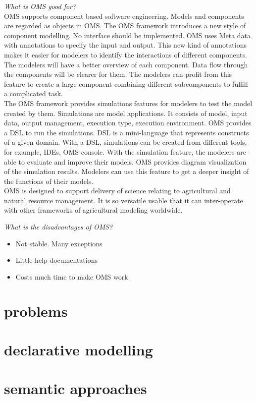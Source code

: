 \emph{What is OMS good for?}\\
OMS supports component based software engineering. Models and components are regarded as objects in OMS. The OMS framework introduces a new style of component modelling. No interface should be implemented. OMS uses Meta data with annotations to specify the input and output. This new kind of annotations makes it easier for modelers to identify the interactions of different components. The modelers will have a better overview of each component. Data flow through the components will be clearer for them. The modelers can profit from this feature to create a large component combining different subcomponents to fulfill a complicated task.\\
The OMS framework provides simulations features for modelers to test the model created by them. Simulations are model applications. It consists of model, input data, output management, execution type, execution environment. OMS provides a DSL to run the simulations. DSL is a mini-language that represents constructs of a given domain. With a DSL, simulations can be created from different tools, for example, IDEs, OMS console. With the simulation feature, the modelers are able to evaluate and improve their models.
OMS provides diagram visualization of the simulation results. Modelers can use this feature to get a deeper insight of the functions of their models.\\
OMS is designed to support delivery of science relating to agricultural and natural resource management. It is so versatile usable that it can inter-operate with other frameworks of agricultural modeling worldwide.

\emph{What is the disadvantages of OMS?}\\
\begin{itemize}
	\item Not stable. Many exceptions
	\item Little help documentations
	\item Costs much time to make OMS work
\end{itemize}

\section{problems}
\section{declarative modelling}
\section{semantic approaches}